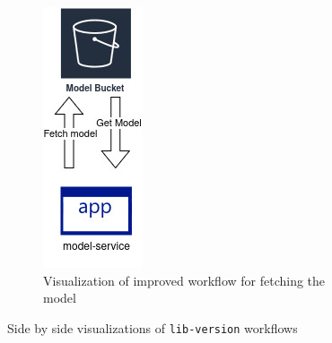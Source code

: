 \begin{figure}[h]
    \hfill
    \begin{subfigure}[b]{0.45\linewidth}
        \centering
        \includegraphics[width=0.35\linewidth]{images/improved_fetch.jpg}
        \caption{Visualization of improved workflow for fetching the model}
        \label{fig:libversion-workflow2}
    \end{subfigure}
    \caption{Side by side visualizations of \texttt{lib-version} workflows}
    \label{fig:fetch-model-workflows}
\end{figure}
